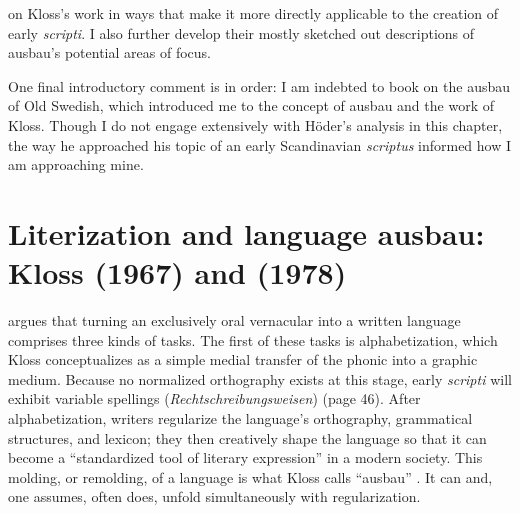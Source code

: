 on Kloss’s work in ways that make it more directly applicable to the creation of early \textit{scripti}. I also further develop their mostly sketched out descriptions of ausbau’s potential areas of focus.

One final introductory comment is in order: I am indebted to  book on the ausbau of Old Swedish, which introduced me to the concept of ausbau and the work of Kloss. Though I do not engage extensively with Höder’s analysis in this chapter, the way he approached his topic of an early Scandinavian \textit{scriptus} informed how I am approaching mine.

\section{Literization and language ausbau: Kloss (1967) and (1978)}\label{sec:4.1}\largerpage[1.75]

\citet[37]{Kloss1978} argues that turning an exclusively oral vernacular into a written language comprises three kinds of tasks. The first of these tasks is alphabetization, which Kloss conceptualizes as a simple medial transfer of the phonic into a graphic medium. Because no normalized orthography exists at this stage, early \textit{scripti} will exhibit variable spellings (\textit{Rechtschreibungsweisen}) (page 46). After alphabetization, writers regularize the language’s orthography, grammatical structures, and lexicon; they then creatively shape the language so that it can become a “standardized tool of literary expression” in a modern society. This molding, or remolding, of a language is what Kloss calls “ausbau” \citep[29]{Kloss1967}. It can and, one assumes, often does, unfold simultaneously with regularization.

